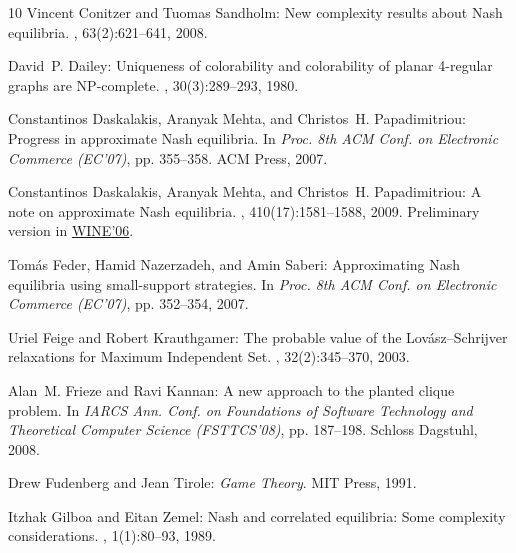 \begin{thebibliography}{10}
{\sc Vincent Conitzer and Tuomas Sandholm}: New complexity results about {N}ash
  equilibria.
, 63(2):621--641, 2008.

{\sc David~P. Dailey}: {Uniqueness of colorability and colorability of planar
  4-regular graphs are {NP}-complete}.
, 30(3):289--293, 1980.
\newblock [\epfmtdoi{10.1016/0012-365X(80)90236-8}]

{\sc Constantinos Daskalakis, Aranyak Mehta, and Christos~H. Papadimitriou}:
  Progress in approximate {N}ash equilibria.
\newblock In {\em Proc. 8th ACM Conf. on Electronic Commerce (EC'07)}, pp.
  355--358. ACM Press, 2007.
\newblock [\epfmtdoi{10.1145/1250910.1250962}]

{\sc Constantinos Daskalakis, Aranyak Mehta, and Christos~H. Papadimitriou}: A
  note on approximate {N}ash equilibria.
, 410(17):1581--1588, 2009.
\newblock Preliminary version in
  \href{http://dx.doi.org/10.1007/11944874_27}{WINE'06}.

{\sc Tom\'{a}s Feder, Hamid Nazerzadeh, and Amin Saberi}: Approximating {N}ash
  equilibria using small-support strategies.
\newblock In {\em Proc. 8th ACM Conf. on Electronic Commerce (EC'07)}, pp.
  352--354, 2007.
\newblock [\epfmtdoi{10.1145/1250910.1250961}]

{\sc Uriel Feige and Robert Krauthgamer}: The probable value of the
  {L}ov{\'a}sz--{S}chrijver relaxations for {M}aximum {I}ndependent {S}et.
, 32(2):345--370, 2003.
\newblock [\epfmtdoi{10.1137/S009753970240118X}]

{\sc Alan~M. Frieze and Ravi Kannan}: A new approach to the planted clique
  problem.
\newblock In {\em IARCS Ann. Conf. on Foundations of Software Technology and
  Theoretical Computer Science (FSTTCS'08)}, pp. 187--198. Schloss Dagstuhl,
  2008.

{\sc Drew Fudenberg and Jean Tirole}: {\em Game Theory}.
\newblock MIT Press, 1991.

{\sc Itzhak Gilboa and Eitan Zemel}: {N}ash and correlated equilibria: Some
  complexity considerations.
, 1(1):80--93, 1989.
\newblock [\epfmtdoi{10.1016/0899-8256(89)90006-7}]


\end{thebibliography}
